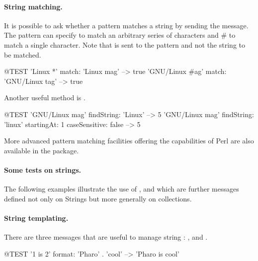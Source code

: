 \documentclass[a4paper,10pt,twoside]{book}
\begin{document}
\paragraph{String matching.}
It is possible to ask whether a pattern matches a string by sending the  message.
The pattern can specify \ct{*} to match an arbitrary series of characters and \# to match a single character. Note that  is sent to the pattern and not the string to be matched.
\begin{code}{@TEST}
'Linux *' match: 'Linux mag'                      --> true
'GNU/Linux #ag' match: 'GNU/Linux tag' --> true
\end{code}

Another useful method is .
\begin{code}{@TEST}
'GNU/Linux mag' findString: 'Linux'                                                      --> 5
'GNU/Linux mag' findString: 'linux' startingAt: 1 caseSensitive: false  --> 5
\end{code}

More advanced pattern matching facilities offering the capabilities of Perl are also available in the  package.

\paragraph{Some tests on strings.} The  following examples illustrate the use of \mbox{,}  and  which are further messages defined not only on Strings but more generally on collections. 


\paragraph{String templating.}
There are three messages that are useful to manage string : ,  and .

\begin{code}{@TEST}
'{1} is {2}' format: {'Pharo' . 'cool'}  --> 'Pharo is cool'
\end{code}
\end{document}
